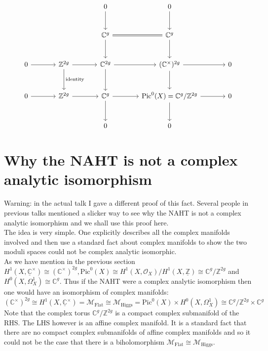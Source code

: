 \begin{equation}
\begin{tikzcd}[sep=large]
& & 0 \arrow[d] & 0 \arrow[d] &  \\
& & \mathbb{C}^{g} \arrow[equal,r] \arrow[d]  & \mathbb{C}^{g} \arrow[d] & \\
0 \arrow[r] & \mathbb{Z}^{2g}  \arrow[r] \arrow[d, "\textrm{identity}"] & \mathbb{C}^{2g} \arrow[r] \arrow[d]  & (\mathbb{C}^\times)^{2g} \arrow[d] \arrow[r] & 0 \\
0 \arrow[r] & \mathbb{Z}^{2g}  \arrow[r] & \mathbb{C}^{g}  \arrow[r] \arrow[d] & \textrm{Pic}^{0}(X)=\mathbb{C}^{g}/\mathbb{Z}^{2g}  \arrow[r] \arrow[d] & 0\\
& & 0 & 0& 
\end{tikzcd}
\end{equation}


\section{Why the NAHT is not a complex analytic isomorphism}

Warning: in the actual talk I gave a different proof of this fact. Several people in previous talks mentioned a slicker way to see why the NAHT is not a complex analytic isomorphism and we shall use this proof here.\\

The idea is very simple. One explicitly describes all the complex manifolds involved and then use a standard fact about complex manifolds to show the two moduli spaces could not be complex analytic isomorphic.\\

As we have mention in the previous section $H^{1}(X,\underline{\mathbb{C}}^\times)\cong(\mathbb{C}^\times)^{2g}, \textrm{Pic}^{0}(X)\cong H^{1}(X,\mathcal{O}_{X})/H^{1}(X,\underline{\mathbb{Z}})\cong\mathbb{C}^{g}/\mathbb{Z}^{2g}$ and $H^{0}(X,\Omega_{X}^{1})\cong \mathbb{C}^{g}$. Thus if the NAHT were a complex analytic isomorphism then one would have an isomorphism of complex manifolds:
\begin{equation*}
(\mathbb{C}^\times)^{2g}\cong H^{1}(X,\underline{\mathbb{C}}^\times)=\mathcal{M}_{\mathrm{Flat}}\cong\mathcal{M}_{\mathrm{Higgs}}=\textrm{Pic}^{0}(X)\times H^{0}(X,\Omega_{X}^{1})\cong\mathbb{C}^{g}/\mathbb{Z}^{2g}\times\mathbb{C}^{g}
\end{equation*}
Note that the complex torus $\mathbb{C}^{g}/\mathbb{Z}^{2g}$ is a compact complex submanifold of the RHS. The LHS however is an affine complex manifold. It is a standard fact that there are no compact complex submanifolds of affine complex manifolds and so it could not be the case that there is a biholomorphism $\mathcal{M}_{\mathrm{Flat}}\cong\mathcal{M}_{\mathrm{Higgs}}$.\\

